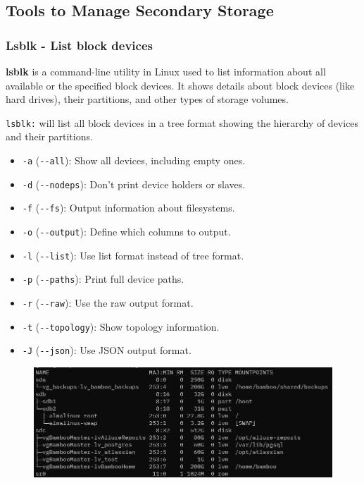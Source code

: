 \documentclass{article}
\begin{document}
\subsection{Tools to Manage Secondary Storage}

\subsubsection{Lsblk - List block devices}
\textbf{lsblk} is a command-line utility in Linux used to list information about all available or the specified block devices. It shows details about block devices (like hard drives), their partitions, and other types of storage volumes.

\verb|lsblk:| will list all block devices in a tree format showing the hierarchy of devices and their partitions.

\begin{itemize}
    \item \verb|-a| (\verb|--all|): Show all devices, including empty ones.
    \item \verb|-d| (\verb|--nodeps|): Don't print device holders or slaves.
    \item \verb|-f| (\verb|--fs|): Output information about filesystems.
    \item \verb|-o| (\verb|--output|): Define which columns to output.
    \item \verb|-l| (\verb|--list|): Use list format instead of tree format.
    \item \verb|-p| (\verb|--paths|): Print full device paths.
    \item \verb|-r| (\verb|--raw|): Use the raw output format.
    \item \verb|-t| (\verb|--topology|): Show topology information.
    \item \verb|-J| (\verb|--json|): Use JSON output format.
\end{itemize}

\begin{figure}[H]
    \includegraphics[width=\textwidth]{pictures/lsblk.png}
    \centering
\end{figure}
\end{document}
